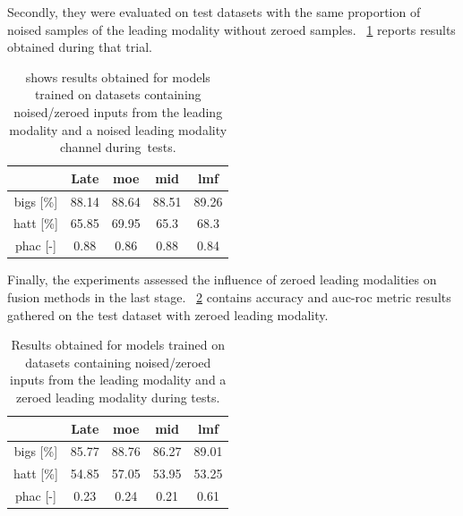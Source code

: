 \documentclass[a4paper, 10pt, twoside]{report}
\begin{document}
Secondly, they were evaluated on test datasets with the same proportion of noised samples of the leading modality without zeroed samples. \Table~\ref{tab:expIIIb} reports results obtained during that trial.

\begin{table}[H]
\centering

\caption{\Table shows results obtained for models trained on datasets containing noised/zeroed inputs from the leading modality and a noised leading modality channel during~tests.}

\begin{tabular}{ccccc}
\toprule
\textbf{}                                    & \textbf{Late} & \textbf{\acrshort{moe}} & \textbf{\acrshort{mid}} & \textbf{\acrshort{lmf}} \\ \midrule
\multicolumn{1}{c}{\acrshort{bigs} {[}\%{]}} & 88.14         & 88.64              & 88.51        & 89.26        \\ \midrule
\multicolumn{1}{c}{\acrshort{hatt} {[}\%{]}} & 65.85         & 69.95              & 65.3         & 68.3         \\ \midrule
\multicolumn{1}{c}{\acrshort{phac}  {[}-{]}} & 0.88          & 0.86               & 0.88         & 0.84         \\ \bottomrule
\end{tabular}
\label{tab:expIIIb}
\end{table}

Finally, the experiments assessed the influence of zeroed leading modalities on fusion methods in the last stage. \Table~\ref{tab:expIIIc} contains accuracy and \acrshort{auc}-\acrshort{roc} metric results gathered on the test dataset with zeroed leading modality.

\begin{table}[H]
\centering

\caption{Results obtained for models trained on datasets containing noised/zeroed inputs from the leading modality and a zeroed leading modality during tests.}

\begin{tabular}{ccccc}
\toprule
\textbf{}                                    & \textbf{Late} & \textbf{\acrshort{moe}} & \textbf{\acrshort{mid}} & \textbf{\acrshort{lmf}} \\ \midrule
\multicolumn{1}{c}{\acrshort{bigs} {[}\%{]}} & 85.77         & 88.76              & 86.27        & 89.01        \\ \midrule
\multicolumn{1}{c}{\acrshort{hatt} {[}\%{]}} & 54.85         & 57.05              & 53.95        & 53.25        \\ \midrule
\multicolumn{1}{c}{\acrshort{phac}  {[}-{]}} & 0.23          & 0.24               & 0.21         & 0.61         \\ \bottomrule
\end{tabular}
\label{tab:expIIIc}
\end{table}
\unskip
\end{document}
